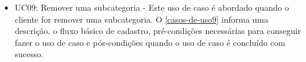 \begin{apendicesenv}
	
	\begin{itemize}
		\item UC09: Remover uma subcategoria - Este uso de caso é abordado quando o cliente for remover uma subcategoria. O 	\autoref{casos-de-uso9}	informa uma descrição, o fluxo básico de cadastro, pré-condições necessárias para conseguir fazer o uso de caso e pós-condições quando o uso de caso é concluído com sucesso.\\
	\end{itemize}
	
	\begin{quadro}[htb]
		\centering
		\ABNTEXfontereduzida
		\caption[Caso de Uso Remover uma subcategoria]{Caso de Uso Remover uma subcategoria}
		\label{casos-de-uso9}
	\end{quadro}
	
	\begin{longtable}{|p{3.3cm}|p{12.3cm}|}
		\hline
		\thead{} & \thead{Ator} \\
		\hline
							

\end{longtable}
\end{apendicesenv}

